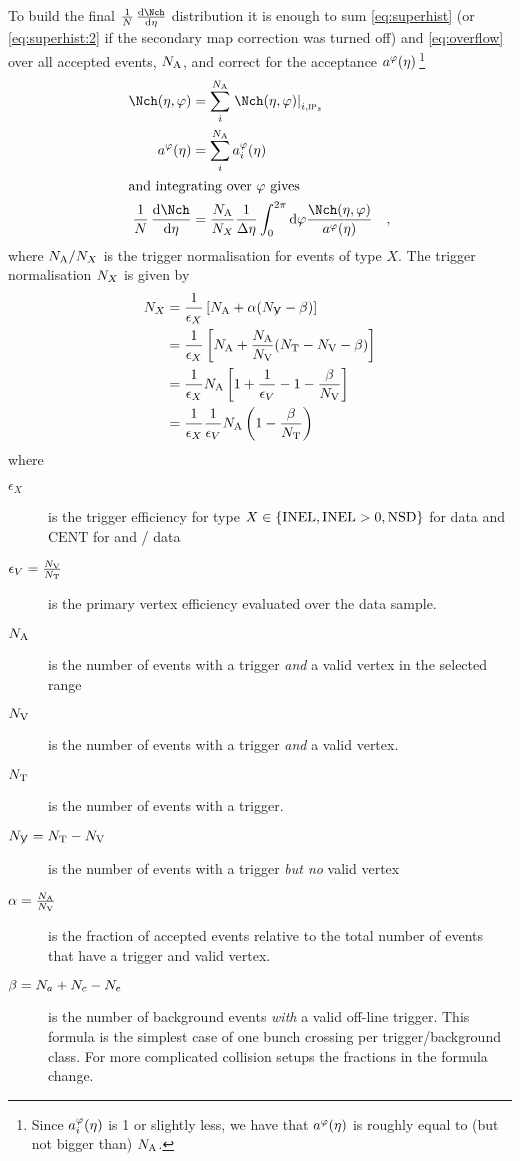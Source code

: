 To build the final $\ndndeta$ distribution it is enough to sum
\eqref{eq:superhist} (or \eqref{eq:superhist:2} if the secondary map
correction was turned off) and \eqref{eq:overflow} over all accepted
events, ${N_{\text{A}}}$, and correct for the acceptance
$a^{\varphi}(\eta){}\,$\footnote{Since $a_i^{\varphi}(\eta)$ is 1 or slightly less, we have
  that $a^{\varphi}(\eta)$ is roughly equal to (but not bigger than) ${N_{\text{A}}}$.}
\begin{align}
  \dndetadphi &= \sum_i^{\NA}\dndetadphi[i,\subIPz]\\ 
  \PhiAcc &= \sum_i^{\NA}\phiAcc\\
\intertext{and integrating over $\varphi$ gives}
  \ndndeta &=
  \frac{\NA}{\N{X}{}} \frac1{\Delta\eta} \int_0^{2\pi} \text{d}\varphi
  \frac{\dndetadphi}{\PhiAcc}\quad,\label{eq:eventnormdndeta}
\end{align}
where ${N_{\text{A}}}/{N_{X}}$ is the trigger normalisation for events of type
$X$.  The trigger normalisation ${N_{X}}$ is given by
\cite{normalization} 
\begin{align}
  {\ensuremath N_{X}} &= \frac{1}{\epsilon_X}\left[{N_{\text{A}}} +
    \alpha({N_{\not{\text{V}}}} -
    \beta)\right]  \label{eq:fulleventnorm}\\
  & = \frac{1}{\epsilon_X}\left[{N_{\text{A}}} + \frac{{N_{\text{A}}}}{{N_{\text{V}}}}({N_{\text{T}}}-{N_{\text{V}}}{} -
    \beta)\right]\nonumber \\
  & =\frac{1}{\epsilon_X}{N_{\text{A}}}\left[1+\frac{1}{\epsilon_V}-1-
    \frac{\beta}{{N_{\text{V}}}}\right]\nonumber\\
  & = \frac{1}{\epsilon_X}\frac{1}{\epsilon_V}{N_{\text{A}}}
  \left(1-\frac{\beta}{{N_{\text{T}}}{}}\right)\nonumber
\end{align}
where
\begin{description}
\item[$\epsilon_X$]  is the trigger efficiency for type
  $X\in\{\INEL,\INELONE,\NSD\}$ for \ppCol{} data and $\text{CENT}$
  for \PbPbCol{} and \pPbCol{}/\PbpCol{} data
\item[$\epsilon_V=\frac{{N_{\text{V}}}{}}{{N_{\text{T}}}{}}$] is the primary vertex
  efficiency evaluated over the data sample.
\item[${N_{\text{A}}}$] is the number of events with a trigger \emph{and} a valid
  vertex in the selected range
\item[${N_{\text{V}}}{}$] is the number of events with a trigger \emph{and} a valid
  vertex. 
\item[${N_{\text{T}}}$] is the number of events with a trigger.
\item[${N_{\not{\text{V}}}}={N_{\text{T}}}-{N_{\text{V}}}{}$] is the number of events with a trigger
  \emph{but no} valid vertex
\item[$\alpha=\frac{{N_{\text{A}}}}{{N_{\text{V}}}}$] is the fraction of accepted events
  relative to the total number of events that have a trigger and valid vertex.  
\item[$\beta={N_{a}}+{N_{c}}-{N_{e}}$] is the number of background
  events \emph{with} a valid off-line trigger. This formula is the
  simplest case of one bunch crossing per trigger/background
  class. For more complicated collision setups the fractions in the
  formula change.
\end{description}
